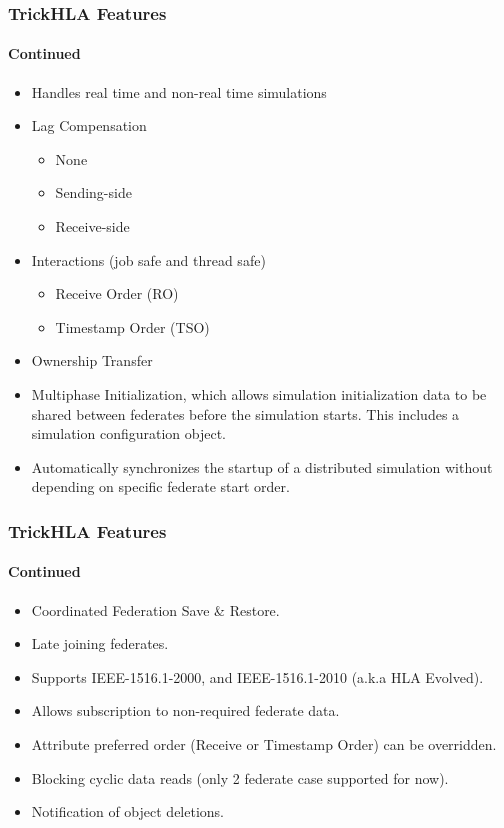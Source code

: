 \documentclass{beamer}
\begin{document}
   \begin{frame}
      \frametitle{TrickHLA Features}
      \framesubtitle{Continued}
      \begin{itemize}
         \item Handles real time and non-real time simulations
         \item Lag Compensation
         \begin{itemize}
            \item None
            \item Sending-side
            \item Receive-side
            \end{itemize}
         \item Interactions (job safe and thread safe)
         \begin{itemize}
            \item Receive Order (RO)
            \item Timestamp Order (TSO)
         \end{itemize}
         \item Ownership Transfer
         \item Multiphase Initialization, which allows simulation initialization data to be shared between federates before the simulation starts. This includes a simulation configuration object.
         \item Automatically synchronizes the startup of a distributed simulation without depending on specific federate start order.
      \end{itemize}
   \end{frame}
   
   \begin{frame}
      \frametitle{TrickHLA Features}
      \framesubtitle{Continued}
      \begin{itemize}
         \item Coordinated Federation Save \& Restore.
         \item Late joining federates.
         \item Supports IEEE-1516.1-2000, and IEEE-1516.1-2010 (a.k.a HLA Evolved).
         \item Allows subscription to non-required federate data.
         \item Attribute preferred order (Receive or Timestamp Order) can be overridden.
         \item Blocking cyclic data reads (only 2 federate case supported for now).
         \item Notification of object deletions.
      \end{itemize}
   \end{frame}
   
\end{document}
